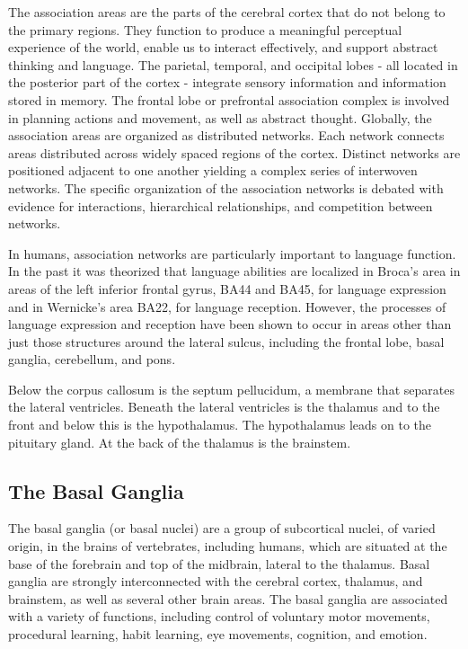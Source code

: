 \documentclass[]{book}
\begin{document}
The association areas are the parts of the cerebral cortex that do not belong to the primary regions. They function to produce a meaningful perceptual experience of the world, enable us to interact effectively, and support abstract thinking and language. The parietal, temporal, and occipital lobes - all located in the posterior part of the cortex - integrate sensory information and information stored in memory. The frontal lobe or prefrontal association complex is involved in planning actions and movement, as well as abstract thought. Globally, the association areas are organized as distributed networks. Each network connects areas distributed across widely spaced regions of the cortex. Distinct networks are positioned adjacent to one another yielding a complex series of interwoven networks. The specific organization of the association networks is debated with evidence for interactions, hierarchical relationships, and competition between networks.

In humans, association networks are particularly important to language function. In the past it was theorized that language abilities are localized in Broca's area in areas of the left inferior frontal gyrus, BA44 and BA45, for language expression and in Wernicke's area BA22, for language reception. However, the processes of language expression and reception have been shown to occur in areas other than just those structures around the lateral sulcus, including the frontal lobe, basal ganglia, cerebellum, and pons.

Below the corpus callosum is the septum pellucidum, a membrane that separates the lateral ventricles. Beneath the lateral ventricles is the thalamus and to the front and below this is the hypothalamus. The hypothalamus leads on to the pituitary gland. At the back of the thalamus is the brainstem.

\hypertarget{the-basal-ganglia}{%
\subsection{The Basal Ganglia}\label{the-basal-ganglia}}

The basal ganglia (or basal nuclei) are a group of subcortical nuclei, of varied origin, in the brains of vertebrates, including humans, which are situated at the base of the forebrain and top of the midbrain, lateral to the thalamus. Basal ganglia are strongly interconnected with the cerebral cortex, thalamus, and brainstem, as well as several other brain areas. The basal ganglia are associated with a variety of functions, including control of voluntary motor movements, procedural learning, habit learning, eye movements, cognition, and emotion.
\end{document}
